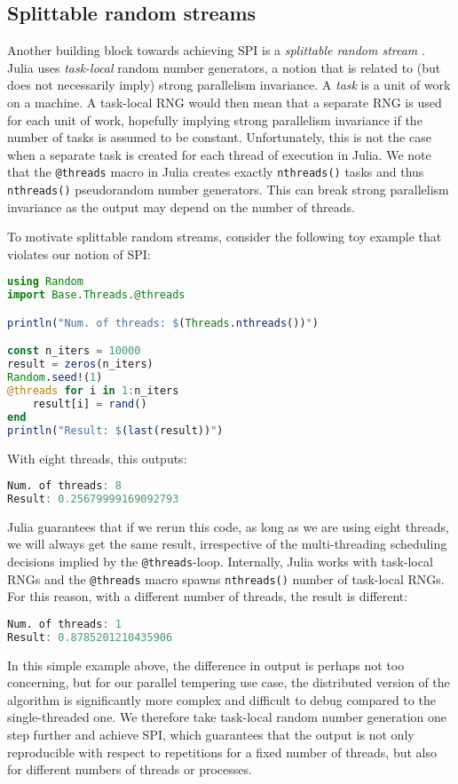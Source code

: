 \subsection{Splittable random streams}
\label{sec:splittable_randoms}
Another building block towards achieving SPI is a \emph{splittable random stream}
\cite{lecuyer1988splittable,burton1992splittable}. 
Julia uses \emph{task-local} random number generators, a notion that is 
related to (but does not necessarily imply) strong parallelism invariance. 
A \emph{task} is a unit of work on a machine.
A task-local RNG would then mean that a separate RNG is 
used for each unit of work, hopefully implying strong parallelism invariance
if the number of tasks is assumed to be constant. 
Unfortunately, this is not the case when a separate task is created for each thread 
of execution in Julia.
We note that the \texttt{@threads} macro in Julia creates exactly \texttt{nthreads()}
tasks and thus \texttt{nthreads()} pseudorandom number generators.
This can break strong parallelism invariance as the output may depend on the number of 
threads.

\medskip 
To motivate splittable random streams, consider the following toy example 
that violates our notion of SPI:
\begin{lstlisting}[language = Julia]
using Random
import Base.Threads.@threads

println("Num. of threads: $(Threads.nthreads())")

const n_iters = 10000
result = zeros(n_iters)
Random.seed!(1)
@threads for i in 1:n_iters
    result[i] = rand()
end
println("Result: $(last(result))")
\end{lstlisting}
With eight threads, this outputs:
\begin{lstlisting}[language = Julia]
Num. of threads: 8
Result: 0.25679999169092793
\end{lstlisting}
Julia guarantees that if we rerun this code, as long as we are using eight threads, 
we will always get the same result, irrespective of the multi-threading 
scheduling decisions implied by the \texttt{@threads}-loop. 
Internally, Julia works with task-local RNGs and the \texttt{@threads} macro 
spawns \texttt{nthreads()} number of task-local RNGs.
For this reason, with a different number of threads, the result is different:
\begin{lstlisting}[language = Julia]
Num. of threads: 1
Result: 0.8785201210435906
\end{lstlisting}

In this simple example above, the difference in output is perhaps not too concerning, 
but for our parallel tempering 
use case, the distributed version of the algorithm is significantly more complex 
and difficult to debug compared to the single-threaded one. We therefore take task-local 
random number generation one step further and achieve SPI, which 
guarantees that the output is not only reproducible with respect to repetitions 
for a fixed number of threads, but also for different numbers of threads or processes.

